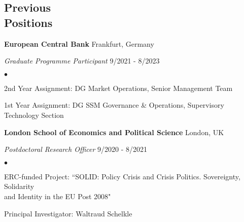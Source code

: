\documentclass[margin, line]{res}
\newenvironment{list1}{
 \begin{list}{\ding{113}}{%
  \setlength{\itemsep}{0in}
  \setlength{\parsep}{0in} \setlength{\parskip}{0in}
  \setlength{\topsep}{0in} \setlength{\partopsep}{0in} 
  \setlength{\leftmargin}{0.17in}}}{\end{list}}
\newenvironment{list2}{
 \begin{list}{$\bullet$}{%
  \setlength{\itemsep}{0in}
  \setlength{\parsep}{0in} \setlength{\parskip}{0in}
  \setlength{\topsep}{0in} \setlength{\partopsep}{0in} 
  \setlength{\leftmargin}{0.2in}}}{\end{list}}
\begin{document}
\begin{resume}
\section{\sc Previous \\
Positions}

\textbf{European Central Bank} \hfill Frankfurt, Germany \\
\vspace*{-.12in}
\begin{list1}
\item[] \textit{Graduate Programme Participant} \hfill 9/2021 - 8/2023 \\[-2ex]
\begin{list2}
\item[] 2nd Year Assignment: DG Market Operations, Senior Management Team
\vspace*{.04in}
\item[] 1st Year Assignment: DG SSM Governance \& Operations, Supervisory Technology Section
\end{list2}
\end{list1}

\textbf{London School of Economics and Political Science} \hfill London, UK \\
\vspace*{-.12in}
\begin{list1}
\item[] \textit{Postdoctoral Research Officer} \hfill 9/2020 - 8/2021 \\[-2ex]
\begin{list2}
\item[] ERC-funded Project: ``SOLID: Policy Crisis and Crisis Politics. Sovereignty, Solidarity \\and Identity in the EU Post 2008"
\vspace*{.04in}
\item[] Principal Investigator: Waltraud Schelkle
\end{list2}
\end{list1}


\end{resume}
\end{document}
